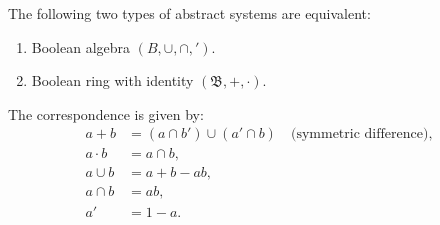 The following two types of abstract systems are equivalent:
\begin{enumerate}
\item Boolean algebra $(B, \cup, \cap, ')$.
\item Boolean ring with identity $(\mathfrak{B}, +, \cdot)$.
\end{enumerate}

The correspondence is given by:
\begin{align*}
a + b &= (a \cap b') \cup (a' \cap b) \quad \text{(symmetric difference)}, \\
a \cdot b &= a \cap b, \\
a \cup b &= a + b - ab, \\
a \cap b &= ab, \\
a' &= 1 - a.
\end{align*}
